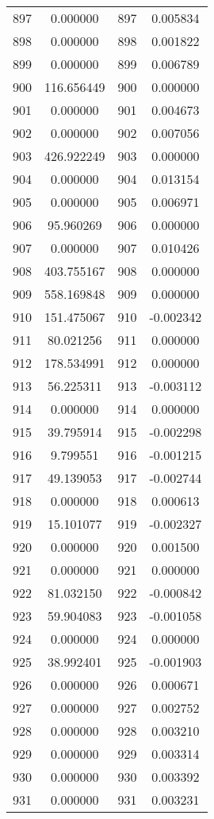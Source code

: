 \documentclass[12pt]{article}
\begin{document}
\begin{longtable}{@{}cccc@{}}
897 & 0.000000 & 897 & 0.005834 \\
898 & 0.000000 & 898 & 0.001822 \\
899 & 0.000000 & 899 & 0.006789 \\
900 & 116.656449 & 900 & 0.000000 \\
901 & 0.000000 & 901 & 0.004673 \\
902 & 0.000000 & 902 & 0.007056 \\
903 & 426.922249 & 903 & 0.000000 \\
904 & 0.000000 & 904 & 0.013154 \\
905 & 0.000000 & 905 & 0.006971 \\
906 & 95.960269 & 906 & 0.000000 \\
907 & 0.000000 & 907 & 0.010426 \\
908 & 403.755167 & 908 & 0.000000 \\
909 & 558.169848 & 909 & 0.000000 \\
910 & 151.475067 & 910 & -0.002342 \\
911 & 80.021256 & 911 & 0.000000 \\
912 & 178.534991 & 912 & 0.000000 \\
913 & 56.225311 & 913 & -0.003112 \\
914 & 0.000000 & 914 & 0.000000 \\
915 & 39.795914 & 915 & -0.002298 \\
916 & 9.799551 & 916 & -0.001215 \\
917 & 49.139053 & 917 & -0.002744 \\
918 & 0.000000 & 918 & 0.000613 \\
919 & 15.101077 & 919 & -0.002327 \\
920 & 0.000000 & 920 & 0.001500 \\
921 & 0.000000 & 921 & 0.000000 \\
922 & 81.032150 & 922 & -0.000842 \\
923 & 59.904083 & 923 & -0.001058 \\
924 & 0.000000 & 924 & 0.000000 \\
925 & 38.992401 & 925 & -0.001903 \\
926 & 0.000000 & 926 & 0.000671 \\
927 & 0.000000 & 927 & 0.002752 \\
928 & 0.000000 & 928 & 0.003210 \\
929 & 0.000000 & 929 & 0.003314 \\
930 & 0.000000 & 930 & 0.003392 \\
931 & 0.000000 & 931 & 0.003231 \\

\end{longtable}
\end{document}
